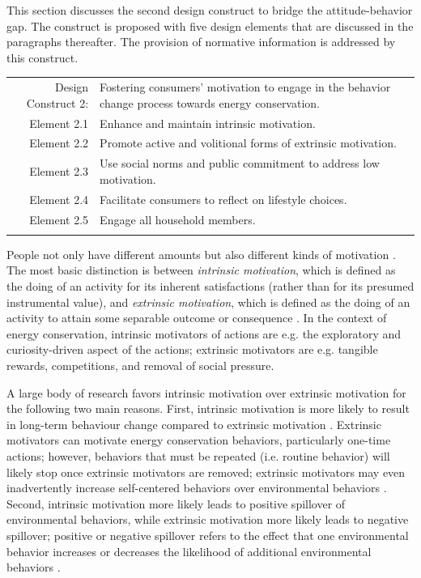 \documentclass[a4paper]{article}
\begin{document}
This section discusses the second design construct to bridge the attitude-behavior gap. The construct is proposed with five design elements that are discussed in the paragraphs thereafter. The provision of normative information is addressed by this construct.

\begin{table}[h!]
\def\arraystretch{1.5}
\begin{tabularx}{\textwidth}{!{\color{gray!40}\vrule} r X !{\color{gray!40}\vrule}}
\hline
{} Design Construct 2:  &  Fostering consumers' motivation to engage in the behavior change process towards energy conservation.\\
Element 2.1 & Enhance and maintain intrinsic motivation. \\
Element 2.2 & Promote active and volitional forms of extrinsic motivation. \\
Element 2.3 & Use social norms and public commitment to address low motivation.\\
Element 2.4 & Facilitate consumers to reflect on lifestyle choices.\\
Element 2.5 & Engage all household members. \\ \hline
\end{tabularx}
\end{table}

People not only have different amounts but also different kinds of motivation \citep{Ryan2000}. The most basic distinction is between \textit{intrinsic motivation}, which is defined as the doing of an activity for its inherent satisfactions (rather than for its presumed instrumental value), and \textit{extrinsic motivation}, which is defined as the doing of an activity to attain some separable outcome or consequence \citep{Ryan2000}. In the context of energy conservation, intrinsic motivators of actions are e.g. the exploratory and curiosity-driven aspect of the actions; extrinsic motivators are e.g. tangible rewards, competitions, and removal of social pressure. 

A large body of research favors intrinsic motivation over extrinsic motivation for the following two main reasons. First, intrinsic motivation is more likely to result in long-term behaviour change compared to extrinsic motivation \citep{He2010}. Extrinsic motivators can motivate energy conservation behaviors, particularly one-time actions; however, behaviors that must be repeated (i.e. routine behavior) will likely stop once extrinsic motivators are removed; extrinsic motivators may even inadvertently increase self-centered behaviors over environmental behaviors \citep{Abrahamse2013,Swim2014}. Second, intrinsic motivation more likely leads to positive spillover of environmental behaviors, while extrinsic motivation more likely leads to negative spillover; positive or negative spillover refers to the effect that one environmental behavior increases or decreases the likelihood of additional environmental behaviors \citep{thogersen2009simple,Truelove2014,Knowles2014}.
\end{document}
